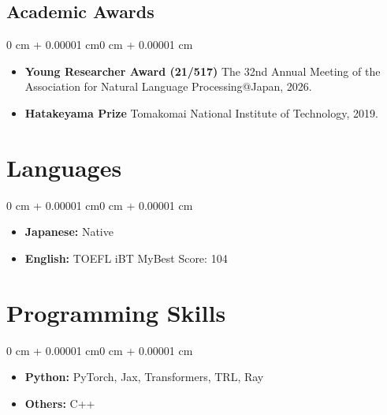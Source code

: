 \documentclass[10pt, letterpaper]{article}
\newenvironment{highlights}{
    \begin{itemize}[
        topsep=0.10 cm,
        parsep=0.10 cm,
        partopsep=0pt,
        itemsep=0pt,
        leftmargin=0 cm + 10pt
    ]
}{
    \end{itemize}
}
\newenvironment{onecolentry}{
    \begin{adjustwidth}{0 cm + 0.00001 cm}{0 cm + 0.00001 cm}
}{
    \end{adjustwidth}
}
\begin{document}
    \subsection{Academic Awards}
        \begin{onecolentry}
            \begin{highlights}
                \item \textbf{Young Researcher Award (21/517)} \newline
                The 32nd Annual Meeting of the Association for Natural Language Processing@Japan, 2026.
    
                \item \textbf{Hatakeyama Prize} \newline
                Tomakomai National Institute of Technology, 2019.
    
            \end{highlights}
        \end{onecolentry}

    \section{Languages}
        \begin{onecolentry}
            \begin{highlights}
                \item \textbf{Japanese:} Native
                \item \textbf{English:} TOEFL iBT MyBest Score: 104
            \end{highlights}
        \end{onecolentry}

    \section{Programming Skills}
        \begin{onecolentry}
            \begin{highlights}
                \item \textbf{Python:} PyTorch, Jax, Transformers, TRL, Ray
                \item \textbf{Others:} C++
            \end{highlights}
        \end{onecolentry}
\end{document}
